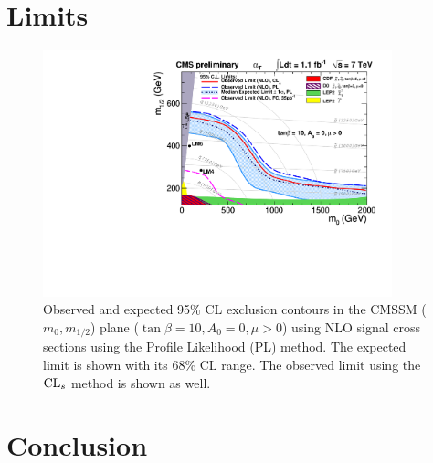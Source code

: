 \section{Limits}

\begin{figure}[h]
  \begin{center}
    \includegraphics[width = 0.90\textwidth]{Figures/Analysis/PAS/RA1_ExclusionLimit_tanb10_def.pdf}
    \caption{\label{fig:cmssm} Observed and expected 95\% CL exclusion
      contours in the CMSSM ($m_0, m_{1/2}$) plane ($\tan \beta = 10,
      A_0 = 0, \mu > 0$) using NLO signal cross sections using the
      Profile Likelihood (PL) method. The expected limit is shown with
      its 68\% CL range.  The observed limit using the $\mbox{CL$_s$}$ method is
      shown as well.  }
  \end{center}
\end{figure}


\section{Conclusion}

